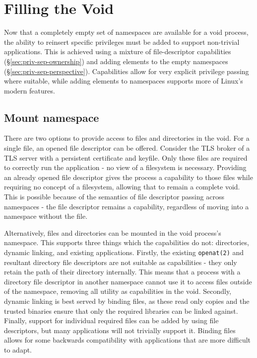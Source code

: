 \documentclass[12pt,a4paper,twoside]{report}
\begin{document}
\chapter{Filling the Void}
\label{chap:filling-the-void}

Now that a completely empty set of namespaces are available for a void process, the ability to reinsert specific privileges must be added to support non-trivial applications. This is achieved using a mixture of file-descriptor capabilities (§\ref{sec:priv-sep-ownership}) and adding elements to the empty namespaces (§\ref{sec:priv-sep-perspective}). Capabilities allow for very explicit privilege passing where suitable, while adding elements to namespaces supports more of Linux's modern features.

\section{Mount namespace}
\label{sec:filling-mount}

There are two options to provide access to files and directories in the void. For a single file, an opened file descriptor can be offered. Consider the TLS broker of a TLS server with a persistent certificate and keyfile. Only these files are required to correctly run the application - no view of a filesystem is necessary. Providing an already opened file descriptor gives the process a capability to those files while requiring no concept of a filesystem, allowing that to remain a complete void. This is possible because of the semantics of file descriptor passing across namespaces - the file descriptor remains a capability, regardless of moving into a namespace without the file.

Alternatively, files and directories can be mounted in the void process's namespace. This supports three things which the capabilities do not: directories, dynamic linking, and existing applications. Firstly, the existing \texttt{openat(2)} and resultant directory file descriptors are not suitable as capabilities - they only retain the path of their directory internally. This means that a process with a directory file descriptor in another namespace cannot use it to access files outside of the namespace, removing all utility as capabilities in the void. Secondly, dynamic linking is best served by binding files, as these read only copies and the trusted binaries ensure that only the required libraries can be linked against. Finally, support for individual required files can be added by using file descriptors, but many applications will not trivially support it. Binding files allows for some backwards compatibility with applications that are more difficult to adapt.
\end{document}
